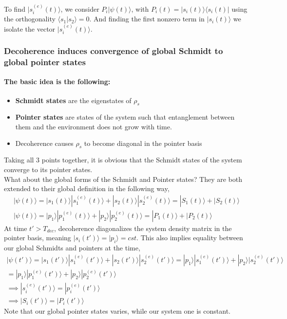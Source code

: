\documentclass{article}
\begin{document}
To find $|s^{(e)}_i(t)\rangle$, we consider $P_i|\psi(t)\rangle$, with $P_i(t)=|s_i(t)\rangle\langle s_i(t)|$ using the orthogonality $\langle s_1|s_2 \rangle=0$. And finding the first nonzero term in $|s_i(t)\rangle$ we isolate the vector $|s^{(e)}_i(t)\rangle$. \\ 

\subsubsection{Decoherence induces convergence of global Schmidt to global pointer states}

\paragraph{The basic idea is the following:}

\begin{itemize}
    \item \textbf{Schmidt states} are the eigenstates of $\rho_s$
    \item \textbf{Pointer states} are states of the system such that entanglement between them and the environment does not grow with time.
    \item Decoherence causes $\rho_s$ to become diagonal in the pointer basis
\end{itemize}
Taking all 3 points together, it is obvious that the Schmidt states of the system converge to its pointer states. \\

What about the global forms of the Schmidt and Pointer states? They are both extended to their global definition in the following way,
\begin{align}
    |\psi(t)\rangle = |s_1(t)\rangle|s_1^{(e)}(t)\rangle+|s_2(t)\rangle|s_2^{(e)}(t)\rangle = |S_1(t)\rangle+|S_2(t)\rangle\\
    |\psi(t)\rangle = |p_1\rangle|p_1^{(e)}(t)\rangle+|p_2\rangle|p_2^{(e)}(t)\rangle = |P_1(t)\rangle+|P_2(t)\rangle
\end{align}
At time $t'>T_{dec}$, decoherence diagonalizes the system density matrix in the pointer basis, meaning $|s_i(t')\rangle=|p_i\rangle=cst$. This also implies equality between our global Schmidts and pointers at the time, 
\begin{align}
    |\psi(t')\rangle = |s_1(t')\rangle|s_1^{(e)}(t')\rangle+|s_2(t')\rangle|s_2^{(e)}(t')\rangle = |p_1\rangle|s_1^{(e)}(t')\rangle+|p_2\rangle|s_2^{(e)}(t')\rangle\\
    =|p_1\rangle|p_1^{(e)}(t')\rangle+|p_2\rangle|p_2^{(e)}(t')\rangle\\
    \implies |s_i^{(e)}(t')\rangle = |p_i^{(e)}(t')\rangle\\
    \implies |S_i(t')\rangle = |P_i(t')\rangle
\end{align}
Note that our global pointer states varies, while our system one is constant. 
\end{document}
